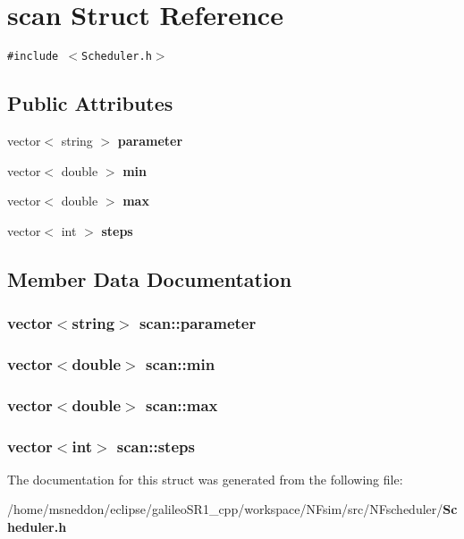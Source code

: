\section{scan Struct Reference}
\label{structscan}
{\tt \#include $<$Scheduler.h$>$}

\subsection*{Public Attributes}
\begin{CompactItemize}
\item 
vector$<$ string $>$ {\bf parameter}
\item 
vector$<$ double $>$ {\bf min}
\item 
vector$<$ double $>$ {\bf max}
\item 
vector$<$ int $>$ {\bf steps}
\end{CompactItemize}


\subsection{Member Data Documentation}
\subsubsection{\setlength{\rightskip}{0pt plus 5cm}vector$<$string$>$ {\bf scan::parameter}}\label{structscan_d35df7d4a9afd5f7ed2ff565578ca5ee}


\subsubsection{\setlength{\rightskip}{0pt plus 5cm}vector$<$double$>$ {\bf scan::min}}\label{structscan_69de89d84300838ecf023e84413f0575}


\subsubsection{\setlength{\rightskip}{0pt plus 5cm}vector$<$double$>$ {\bf scan::max}}\label{structscan_f3f102e6967d3c80d380e613c27444ec}


\subsubsection{\setlength{\rightskip}{0pt plus 5cm}vector$<$int$>$ {\bf scan::steps}}\label{structscan_744124dd3b3f269f0b855cb7b8dfa5ae}




The documentation for this struct was generated from the following file:\begin{CompactItemize}
\item 
/home/msneddon/eclipse/galileoSR1\_\-cpp/workspace/NFsim/src/NFscheduler/{\bf Scheduler.h}\end{CompactItemize}
